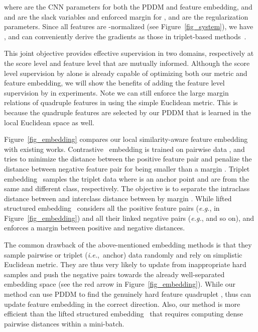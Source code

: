 \documentclass{article}
\newcommand{\eg}{\emph{e.g.}}
\newcommand{\ie}{\emph{i.e.}}
\begin{document}
where  are the CNN parameters for both the PDDM and feature embedding, and  and  are the slack variables and enforced margin for , and  are the regularization parameters. Since all features are -normalized (see Figure~\ref{fig_system}), we have , and can conveniently derive the gradients as those in triplet-based methods~\cite{Schroff2015,Wang2014}.

This joint objective provides effective supervision in two domains, respectively at the score level and feature level that are mutually informed. Although the score level supervision by  alone is already capable of optimizing both our metric and feature embedding, we will show the benefits of adding the feature level supervision by  in experiments.
Note we can still enforce the large margin relations of quadruple features in  using the simple Euclidean metric. This is because the quadruple features are selected by our PDDM that is learned in the local Euclidean space as well.


Figure~\ref{fig_embedding} compares our local similarity-aware feature embedding with existing works. Contrastive~\cite{bell15productnet} embedding is trained on pairwise data , and tries to minimize the distance between the positive feature pair and penalize the distance between negative feature pair for being smaller than a margin . Triplet embedding~\cite{Schroff2015,Wang2014} samples the triplet data  where  is an anchor point and  are from the same and different class, respectively. The objective is to separate the intraclass distance between  and interclass distance between  by margin . While lifted structured embedding~\cite{songCVPR16} considers all the positive feature pairs (\eg,  in Figure~\ref{fig_embedding}) and all their linked negative pairs (\eg,  and so on), and enforces a margin  between positive and negative distances.

The common drawback of the above-mentioned embedding methods is that they sample pairwise or triplet (\ie,~anchor) data randomly and rely on simplistic Euclidean metric. They are thus very likely to update from inappropriate hard samples and push the negative pairs towards the already well-separated embedding space (see the red arrow in Figure~\ref{fig_embedding}). While our method can use PDDM to find the genuinely hard feature quadruplet , thus can update feature embedding in the correct direction. Also, our method is more efficient than the lifted structured embedding~\cite{songCVPR16} that requires computing dense pairwise distances within a mini-batch.
\end{document}
